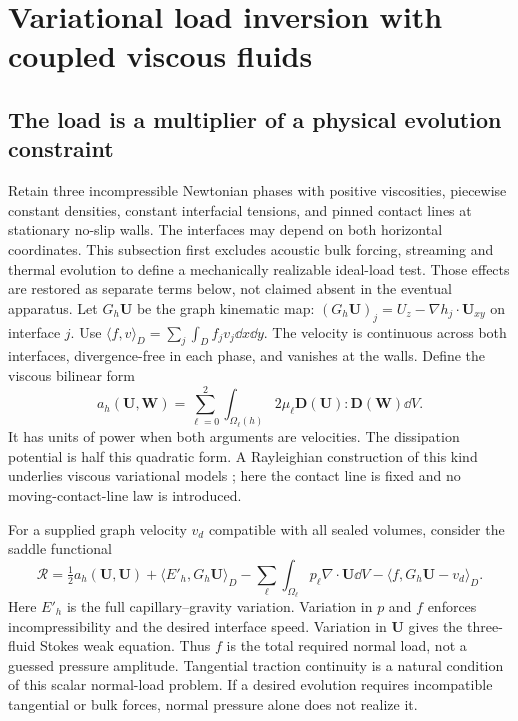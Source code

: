 \section{Variational load inversion with coupled viscous fluids}
\label{sec:viscous-load-inverse}

\subsection{The load is a multiplier of a physical evolution constraint}
Retain three incompressible Newtonian phases with positive viscosities,
piecewise constant densities, constant interfacial tensions, and pinned
contact lines at stationary no-slip walls. The interfaces may depend on both
horizontal coordinates. This subsection first excludes acoustic bulk forcing,
streaming and thermal evolution to define a mechanically realizable ideal-load
test. Those effects are restored as separate terms below, not claimed absent
in the eventual apparatus. Let $G_h\bm U$ be the graph kinematic map:
$(G_h\bm U)_j=U_z-\nabla h_j\cdot\bm U_{xy}$ on interface $j$.
Use $\langle f,v\rangle_D=\sum_j\int_D f_jv_j\dd x\dd y$.
The velocity is continuous across both interfaces, divergence-free in each
phase, and vanishes at the walls. Define the viscous bilinear form
\[
 a_h(\bm U,\bm W)=\sum_{\ell=0}^2\int_{\Omega_\ell(h)}
           2\mu_\ell\bm D(\bm U):\bm D(\bm W)\dd V.
\]
It has units of power when both arguments are velocities. The dissipation
potential is half this quadratic form. A Rayleighian construction of this
kind underlies viscous variational models \cite{qian2006}; here the contact
line is fixed and no moving-contact-line law is introduced.

For a supplied graph velocity $v_d$ compatible with all sealed volumes,
consider the saddle functional
\begin{equation}
 \mathscr R=\tfrac12 a_h(\bm U,\bm U)
       +\langle E'_h,G_h\bm U\rangle_D
       -\sum_\ell\int_{\Omega_\ell}p_\ell\nabla\cdot\bm U\dd V
       -\langle f,G_h\bm U-v_d\rangle_D.
 \label{eq:viscous-rayleighian}
\end{equation}
Here $E'_h$ is the full capillary--gravity variation. Variation in $p$ and
$f$ enforces incompressibility and the desired interface speed. Variation in
$\bm U$ gives the three-fluid Stokes weak equation. Thus $f$ is the total
required normal load, not a guessed pressure amplitude. Tangential traction
continuity is a natural condition of this scalar normal-load problem. If a
desired evolution requires incompatible tangential or bulk forces, normal
pressure alone does not realize it.

